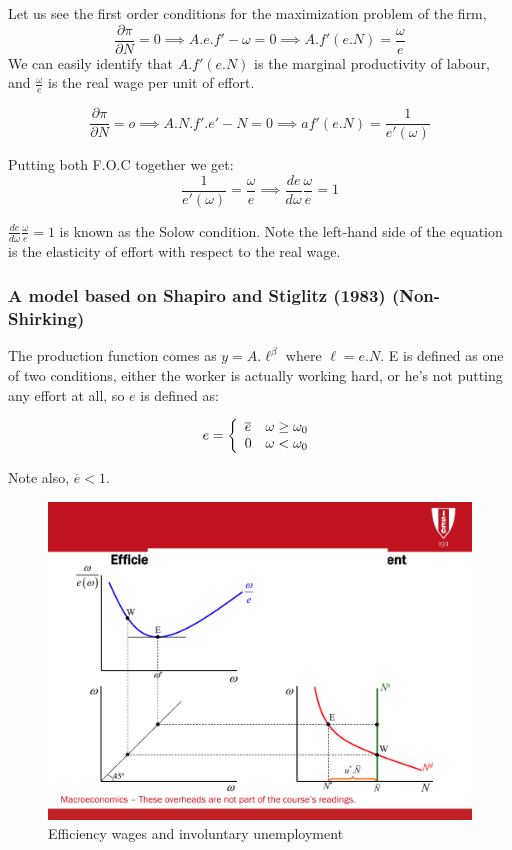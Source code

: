 Let us see the first order conditions for the maximization problem of the firm, 
\begin{equation*}
    \frac{\partial\pi}{\partial N}= 0 \implies A.e.f'-\omega=0 \implies A.f'(e.N)=\frac{\omega}{e}
\end{equation*}
We can easily identify that $A.f'(e.N)$ is the marginal productivity of labour, and $\tfrac{\omega}{e}$ is the real wage per unit of effort. 

\begin{equation*}
    \frac{\partial\pi}{\partial N}=o \implies A.N.f'.e'-N=0 \implies af'(e.N)=\frac{1}{e'(\omega)}
\end{equation*}

Putting both F.O.C together we get:
\begin{equation*}
    \frac{1}{e'(\omega)}=\frac{\omega}{e} \implies \frac{de}{d\omega}\frac{\omega}{e}=1    
\end{equation*}

$\frac{de}{d\omega}\frac{\omega}{e}=1$ is known as the Solow condition. Note the left-hand side of the equation is the elasticity of effort with respect to the real wage. 

\subsubsection{A model based on Shapiro and Stiglitz (1983) (Non-Shirking)}

The production function comes as $y=A.\ell^{\beta}$ where $\ell=e.N$. E is defined as one of two conditions, either the worker is actually working hard, or he's not putting any effort at all, so $e$ is defined as: 

\[
e= \left\{
    \begin{array}{l l}
         \overline{e} & \omega\geq\omega_{0} \\
         0  & \omega<\omega_{0}
    \end{array}
\right.
\]

Note also, $\overline{e}<1$.

\begin{figure}[H]
    \centering
    \includegraphics[max width=\linewidth]{4_0_New_Keynesian_School/efficiency_wages_graph.pdf}
    \caption{Efficiency wages and involuntary unemployment}  
\end{figure}
